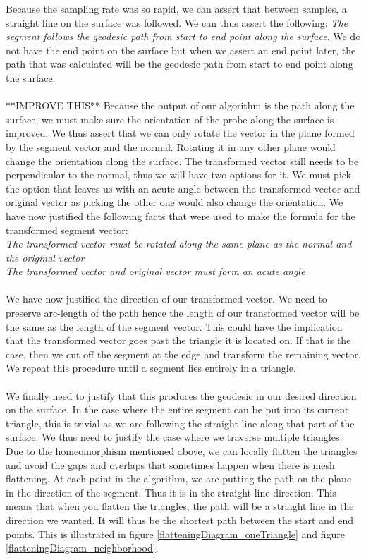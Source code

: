 \documentclass[conference]{acmsiggraph}
\begin{document}
Because the sampling rate was so rapid, we can assert that between samples, a straight line on the surface was followed. We can thus assert the following: {\it The segment follows the geodesic path from start to end point along the surface}. We do not have the end point on the surface but when we assert an end point later, the path that was calculated will be the geodesic path from start to end point along the surface. \\
\\
**IMPROVE THIS** Because the output of our algorithm is the path along the surface, we must make sure the orientation of the probe along the surface is improved. We thus assert that we can only rotate the vector in the plane formed by the segment vector and the normal. Rotating it in any other plane would change the orientation along the surface. The transformed vector still needs to be perpendicular to the normal, thus we will have two options for it. We must pick the option that leaves us with an acute angle between the transformed vector and original vector as picking the other one would also change the orientation. We have now justified the following facts that were used to make the formula for the transformed segment vector: \\
{\it The transformed vector must be rotated along the same plane as the normal and the original vector}\\
{\it The transformed vector and original vector must form an acute angle}
\\
\\
We have now justified the direction of our transformed vector. We need to preserve arc-length of the path hence the length of our transformed vector will be the same as the length of the segment vector. This could have the implication that the transformed vector goes past the triangle it is located on. If that is the case, then we cut off the segment at the edge and transform the remaining vector. We repeat this procedure until a segment lies entirely in a triangle. \\
\\
We finally need to justify that this produces the geodesic in our desired direction on the surface. In the case where the entire segment can be put into its current triangle, this is trivial as we are following the straight line along that part of the surface. We thus need to justify the case where we traverse multiple triangles. Due to the homeomorphism mentioned above, we can locally flatten the triangles and avoid the gaps and overlaps that sometimes happen when there is mesh flattening. At each point in the algorithm, we are putting the path on the plane in the direction of the segment. Thus it is in the straight line direction. This means that when you flatten the triangles, the path will be a straight line in the direction we wanted. It will thus be the shortest path between the start and end points. This is illustrated in figure \ref{flatteningDiagram_oneTriangle} and figure \ref{flatteningDiagram_neighborhood}. 
\end{document}
